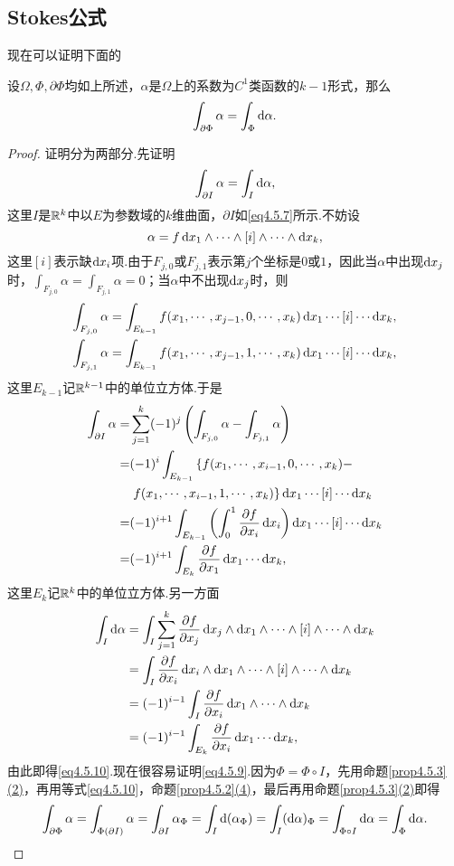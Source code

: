 \subsection{Stokes公式}
现在可以证明下面的
\begin{theorem}\label{thm4.5.4}
	设$\Omega,\Phi,\partial\Phi$均如上所述，$\alpha$是$\Omega$上的系数为$C^1$类函数的$k-1$形式，那么
	\begin{equation}\label{eq4.5.9}
		\int_{\partial\Phi}\alpha=\int_\Phi \mathop{}\!\mathrm{d}\alpha.
	\end{equation}
\end{theorem}
\begin{proof}
	证明分为两部分.先证明
	\begin{equation}\label{eq4.5.10}
		\int_{\partial I}\alpha=\int_I \mathop{}\!\mathrm{d}\alpha,
	\end{equation}
这里$I$是$\mathbb R^k$中以$E$为参数域的$k$维曲面，$\partial I$如\eqref{eq4.5.7}所示.不妨设
\[\alpha=f\mathop{}\!\mathrm dx_1\wedge\cdots\wedge[i]\wedge\cdots\wedge\mathop{}\!\mathrm dx_k,\]
这里$[i]$表示缺$\mathop{}\!\mathrm dx_i$项.由于$F_{j,0}$或$F_{j,1}$表示第$j$个坐标是$0$或$1$，因此当$\alpha$中出现$\mathop{}\!\mathrm dx_j$时，$\int_{F_{j,0}}\alpha=\int_{F_{j,1}}\alpha=0$；当$\alpha$中不出现$\mathop{}\!\mathrm dx_j$时，则
\begin{align*}
	\int_{F_{j,0}}\alpha
	=\int_{E_{k-1}}f(x_1,\cdots,x_{j-1},0,\cdots,x_k)\mathop{}\!\mathrm dx_1\cdots[i]\cdots\mathop{}\!\mathrm dx_k,\\
	\int_{F_{j,1}}\alpha
	=\int_{E_{k-1}}f(x_1,\cdots,x_{j-1},1,\cdots,x_k)\mathop{}\!\mathrm dx_1\cdots[i]\cdots\mathop{}\!\mathrm dx_k,
\end{align*}
这里$E_{k-1}$记$\mathbb R^{k-1}$中的单位立方体.于是
\begin{align*}
	\int_{\partial I}\alpha
	=&\sum_{j=1}^{k}(-1)^j\left(\int_{F_{j,0}}\alpha-\int_{F_{j,1}}\alpha\right)\\
	=&(-1)^i \int_{E_{k-1}}\left\{f(x_1,\cdots,x_{i-1},0,\cdots,x_k)-\right.\\
	&\left. f(x_1,\cdots,x_{i-1},1,\cdots,x_k)\right\}\mathop{}\!\mathrm dx_1\cdots[i]\cdots\mathop{}\!\mathrm dx_k\\
	=&(-1)^{i+1}\int_{E_{k-1}}\left(\int_{0}^{1}\frac{\partial f}{\partial x_i}\mathop{}\!\mathrm dx_i\right)\mathop{}\!\mathrm dx_1\cdots[i]\cdots\mathop{}\!\mathrm dx_k\\
	=&(-1)^{i+1}\int_{E_k} \frac{\partial f}{\partial x_1}\mathop{}\!\mathrm dx_1\cdots\mathop{}\!\mathrm dx_k,
\end{align*}
这里$E_k$记$\mathbb R^k$中的单位立方体.另一方面
\begin{align*}
	\int_I \dif\alpha
	&=\int_I \sum_{j=1}^{k}\pp{f}{x_j}\dx_j\wedge\dx_1\wedge\cdots\wedge[i]\wedge\cdots\wedge\dx_k\\
	&=\int_I \pp{f}{x_i}\dx_i\wedge\dx_1\wedge\cdots\wedge[i]\wedge\cdots\wedge\dx_k\\
	&=(-1)^{i-1}\int_I \pp{f}{x_i}\dx_1\wedge\cdots\wedge\dx_k\\
	&=(-1)^{i-1}\int_{E_k}\pp{f}{x_i}\dx_1\cdots\dx_k,
\end{align*}
由此即得\eqref{eq4.5.10}.现在很容易证明\eqref{eq4.5.9}.因为$\Phi=\Phi\circ I$，先用命题\ref{prop4.5.3}\hyperlink{4.5.3}{(2)}，再用等式\eqref{eq4.5.10}，命题\ref{prop4.5.2}\hyperlink{4.5.2}{(4)}，最后再用命题\ref{prop4.5.3}\hyperlink{4.5.3}{(2)}即得
\[\int_{\partial\Phi}\alpha=\int_{\Phi(\partial I)}\alpha=\int_{\partial I}\alpha_\Phi=\int_I \mathop{}\!\mathrm{d}(\alpha_\Phi)=\int_I (\mathop{}\!\mathrm{d}\alpha)_\Phi=\int_{\Phi\circ I}\mathop{}\!\mathrm{d}\alpha=\int_\Phi \mathop{}\!\mathrm{d}\alpha.\qedhere\]
\end{proof}
